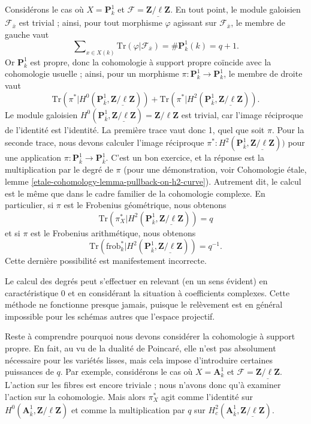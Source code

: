 \medskip\noindent
Considérons le cas où $X = \mathbf{P}^1_k$ et $\mathcal{F} =
\underline{\mathbf{Z}/\ell\mathbf{Z}}$. En tout point, le module galoisien
$\mathcal{F}_{\bar x}$ est trivial ; ainsi, pour tout morphisme $\varphi$ agissant sur
$\mathcal{F}_{\bar x}$, le membre de gauche vaut
$$
\sum\nolimits_{x \in X(k)} \text{Tr}(\varphi | \mathcal{F}_{\bar x}) =
\#\mathbf{P}^1_k(k) = q+1.
$$
Or $\mathbf{P}^1_k$ est propre, donc la cohomologie à support propre coïncide avec la
cohomologie usuelle ; ainsi, pour un morphisme $\pi : \mathbf{P}^1_k \to
\mathbf{P}^1_k$, le membre de droite vaut
$$
\text{Tr}(\pi^* | H^0 (\mathbf{P}^1_{\bar k},
\underline{\mathbf{Z}/\ell\mathbf{Z}})) + \text{Tr}(\pi^* | H^2
(\mathbf{P}^1_{\bar k}, \underline{\mathbf{Z}/\ell\mathbf{Z}})).
$$
Le module galoisien $H^0 (\mathbf{P}^1_{\bar k},
\underline{\mathbf{Z}/\ell\mathbf{Z}}) = \mathbf{Z}/\ell\mathbf{Z}$ est trivial,
car l'image réciproque de l'identité est l'identité. La première trace vaut donc 1,
quel que soit $\pi$. Pour la seconde trace, nous devons calculer l'image réciproque
$\pi^* : H^2(\mathbf{P}^1_{\bar k}, \underline{\mathbf{Z}/\ell\mathbf{Z}}))$
pour une application $\pi : \mathbf{P}^1_{\bar k} \to \mathbf{P}^1_{\bar k}$. C'est un
bon exercice, et la réponse est la multiplication par le degré de $\pi$
(pour une démonstration, voir
Cohomologie étale, lemme \ref{etale-cohomology-lemma-pullback-on-h2-curve}).
Autrement dit, le calcul est le même que dans le cadre familier de la cohomologie complexe.
En particulier, si $\pi$ est le Frobenius géométrique, nous obtenons
$$
\text{Tr}(\pi_X^* | H^2 (\mathbf{P}^1_{\bar k},
\underline{\mathbf{Z}/\ell\mathbf{Z}})) = q
$$
et si $\pi$ est le Frobenius arithmétique, nous obtenons
$$
\text{Tr}(\text{frob}_k^* | H^2 (\mathbf{P}^1_{\bar k},
\underline{\mathbf{Z}/\ell\mathbf{Z}})) = q^{-1}.
$$
Cette dernière possibilité est manifestement incorrecte.

\begin{remark}
\label{remark-compute-degree-lifting}
Le calcul des degrés peut s'effectuer en relevant (en un sens évident)
en caractéristique 0 et en considérant la situation à coefficients complexes.
Cette méthode ne fonctionne presque jamais, puisque le relèvement est en général impossible pour les
schémas autres que l'espace projectif.
\end{remark}

\noindent
Reste à comprendre pourquoi nous devons considérer la cohomologie à support
propre. En fait, au vu de la dualité de Poincar\'e, elle n'est pas absolument
nécessaire pour les variétés lisses, mais cela impose d'introduire certaines puissances
de $q$. Par exemple, considérons le cas où
$X = \mathbf{A}^1_k$ et
$\mathcal{F} = \underline{\mathbf{Z}/\ell\mathbf{Z}}$.
L'action sur les fibres est encore triviale ; nous n'avons donc qu'à examiner l'action
sur la cohomologie. Mais alors $\pi_X^*$ agit comme l'identité sur
$H^0(\mathbf{A}^1_{\bar k}, \underline{\mathbf{Z}/\ell\mathbf{Z}})$
et comme la multiplication par $q$ sur
$H^2_c(\mathbf{A}^1_{\bar k}, \underline{\mathbf{Z}/\ell\mathbf{Z}})$.




